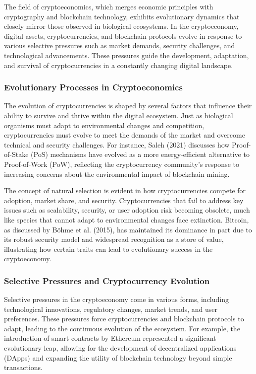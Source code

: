 \documentclass[12pt,twoside]{article}
\begin{document}
The field of cryptoeconomics, which merges economic principles with cryptography and blockchain technology, exhibits evolutionary dynamics that closely mirror those observed in biological ecosystems. In the cryptoeconomy, digital assets, cryptocurrencies, and blockchain protocols evolve in response to various selective pressures such as market demands, security challenges, and technological advancements. These pressures guide the development, adaptation, and survival of cryptocurrencies in a constantly changing digital landscape.

\subsubsection{Evolutionary Processes in Cryptoeconomics}

The evolution of cryptocurrencies is shaped by several factors that influence their ability to survive and thrive within the digital ecosystem. Just as biological organisms must adapt to environmental changes and competition, cryptocurrencies must evolve to meet the demands of the market and overcome technical and security challenges. For instance, Saleh (2021) discusses how Proof-of-Stake (PoS) mechanisms have evolved as a more energy-efficient alternative to Proof-of-Work (PoW), reflecting the cryptocurrency community's response to increasing concerns about the environmental impact of blockchain mining.

The concept of natural selection is evident in how cryptocurrencies compete for adoption, market share, and security. Cryptocurrencies that fail to address key issues such as scalability, security, or user adoption risk becoming obsolete, much like species that cannot adapt to environmental changes face extinction. Bitcoin, as discussed by Böhme et al. (2015), has maintained its dominance in part due to its robust security model and widespread recognition as a store of value, illustrating how certain traits can lead to evolutionary success in the cryptoeconomy.


\subsubsection{Selective Pressures and Cryptocurrency Evolution}

Selective pressures in the cryptoeconomy come in various forms, including technological innovations, regulatory changes, market trends, and user preferences. These pressures force cryptocurrencies and blockchain protocols to adapt, leading to the continuous evolution of the ecosystem. For example, the introduction of smart contracts by Ethereum represented a significant evolutionary leap, allowing for the development of decentralized applications (DApps) and expanding the utility of blockchain technology beyond simple transactions.
\end{document}
